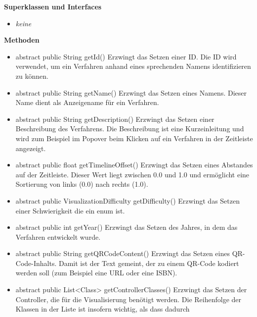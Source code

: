 \documentclass{article}
\begin{document}
      \textbf{Superklassen und Interfaces}
      \begin{itemize}
        \item \textit{keine}
      \end{itemize}
	
      \textbf{Methoden}
      \begin{itemize}
        \item abstract public String getId() \newline
          Erzwingt das Setzen einer ID. Die ID wird verwendet, um ein Verfahren anhand
          eines sprechenden Namens identifizieren zu können.
        \item abstract public String getName() \newline
          Erzwingt das Setzen eines Namens. Dieser Name dient als Anzeigename für ein
          Verfahren.
        \item abstract public String getDescription() \newline
          Erzwingt das Setzen einer Beschreibung des Verfahrens. Die Beschreibung ist
          eine Kurzeinleitung und wird zum Beispiel im Popover beim Klicken auf ein
          Verfahren in der Zeitleiste angezeigt.
        \item abstract public float getTimelineOffset() \newline
          Erzwingt das Setzen eines Abstandes auf der Zeitleiste. Dieser Wert liegt
          zwischen 0.0 und 1.0 und ermöglicht eine Sortierung von links (0.0) nach rechts (1.0).
        \item abstract public VisualizationDifficulty getDifficulty() \newline
          Erzwingt das Setzen einer Schwierigkeit die ein enum ist.
        \item abstract public int getYear() \newline
          Erzwingt das Setzen des Jahres, in dem das Verfahren entwickelt wurde.
        \item abstract public String getQRCodeContent() \newline
          Erzwingt das Setzen eines QR-Code-Inhalts. Damit ist der Text gemeint, der
          zu einem QR-Code kodiert werden soll (zum Beispiel eine URL oder eine ISBN).
        \item abstract public List<Class> getControllerClasses() \newline
          Erzwingt das Setzen der Controller, die für die Visualisierung benötigt werden.
          Die Reihenfolge der Klassen in der Liste ist insofern wichtig, als dass dadurch

\end{itemize}
\end{document}
